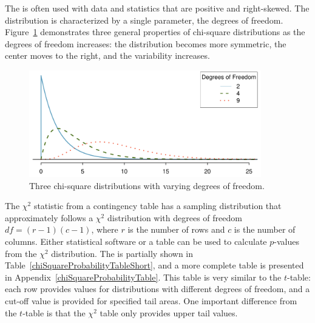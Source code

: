 The  is often used with data and statistics that are positive and right-skewed.  The distribution is characterized by a single parameter, the degrees of freedom. Figure~\ref{chiSquareDistributionWithInceasingDF} demonstrates three general properties of chi-square distributions as the degrees of freedom increases: the distribution becomes more symmetric, the center moves to the right, and the variability increases.

\begin{figure}[h]
	\centering
	\includegraphics[width=0.9\textwidth]{ch_inference_for_props_oi_biostat/figures/chiSquareDistributionWithInceasingDF/chiSquareDistributionWithInceasingDF}
	\caption{Three chi-square distributions with varying degrees of freedom.}
	\label{chiSquareDistributionWithInceasingDF}
\end{figure}


The $\chi^2$ statistic from a contingency table has a sampling distribution that approximately follows a $\chi^2$ distribution with degrees of freedom $df = (r-1)(c-1)$, where $r$ is the number of rows and $c$ is the number of columns. Either statistical software or a table can be used to calculate $p$-values from the $\chi^2$ distribution. The  is partially shown in Table~\ref{chiSquareProbabilityTableShort}, and a more complete table is presented in Appendix~\vref{chiSquareProbabilityTable}. This table is very similar to the $t$-table: each row provides values for distributions with different degrees of freedom, and a cut-off value is provided for specified tail areas. One important difference from the $t$-table is that the $\chi^2$ table only provides upper tail values.

